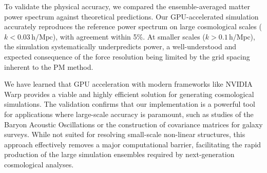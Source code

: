 \documentclass[]{article}
\begin{document}
To validate the physical accuracy, we compared the ensemble-averaged matter power spectrum against theoretical predictions. Our GPU-accelerated simulation accurately reproduces the reference power spectrum on large cosmological scales ($k < 0.03 \, \text{h/Mpc}$), with agreement within 5\%. At smaller scales ($k > 0.1 \, \text{h/Mpc}$), the simulation systematically underpredicts power, a well-understood and expected consequence of the force resolution being limited by the grid spacing inherent to the PM method.

We have learned that GPU acceleration with modern frameworks like NVIDIA Warp provides a viable and highly efficient solution for generating cosmological simulations. The validation confirms that our implementation is a powerful tool for applications where large-scale accuracy is paramount, such as studies of the Baryon Acoustic Oscillations or the construction of covariance matrices for galaxy surveys. While not suited for resolving small-scale non-linear structures, this approach effectively removes a major computational barrier, facilitating the rapid production of the large simulation ensembles required by next-generation cosmological analyses.


{}

\end{document}
